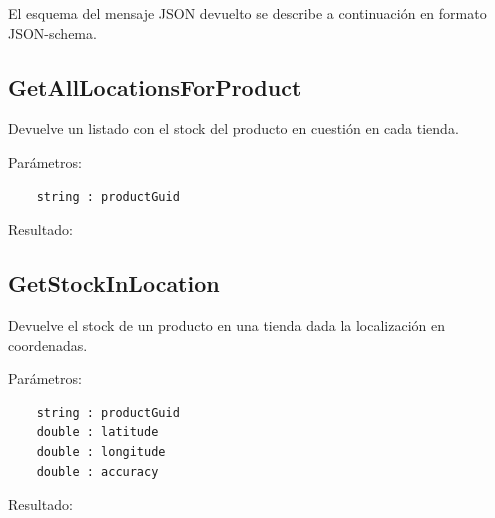 El esquema del mensaje JSON devuelto se describe a continuación en formato JSON-schema.



\subsection{GetAllLocationsForProduct}
Devuelve un listado con el stock del producto en cuestión en cada tienda.

Parámetros:
\begin{lstlisting}
	string : productGuid
\end{lstlisting}


Resultado:


\subsection{GetStockInLocation}
Devuelve el stock de un producto en una tienda dada la localización en coordenadas.

Parámetros:
\begin{lstlisting}
	string : productGuid
	double : latitude
	double : longitude
	double : accuracy
\end{lstlisting}

Resultado:


\chapterend